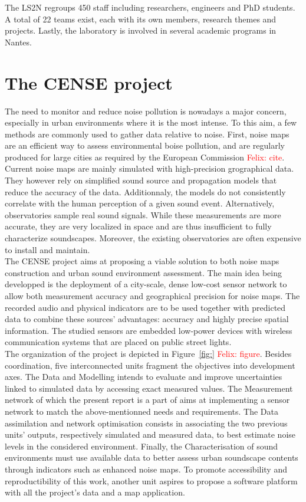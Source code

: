 \documentclass[12pt,times,onecolumn]{article}
\newcommand{\fg}[1]{\textcolor{red}{ Felix: #1}}
\begin{document}
The LS2N regroups 450 staff including researchers, engineers and PhD students. A total of 22 teams exist, each with its own members, research themes and projects. Lastly, the laboratory is involved in several academic programs in Nantes.

\section{The CENSE project}

The need to monitor and reduce noise pollution is nowadays a major concern, especially in urban environments where it is the most intense. To this aim, a few methods are commonly used to gather data relative to noise. First, noise maps are an efficient way to assess environmental boise pollution, and are regularly produced for large cities as required by the European Commission \fg{cite}. Current noise maps are mainly simulated with high-precision grographical data. They however rely on simplified sound source and propagation models that reduce the accuracy of the data. Additionnaly, the models do not consistently correlate with the human perception of a given sound event. Alternatively, observatories sample real sound signals. While these measurements are more accurate, they are very localized in space and are thus insufficient to fully characterize soundscapes. Moreover, the existing observatories are often expensive to install and maintain.\\

The CENSE project aims at proposing a viable solution to both noise maps construction and urban sound environment assessment. The main idea being developped is the deployment of a city-scale, dense low-cost sensor network to allow both measurement accuracy and geographical precision for noise maps. The recorded audio and physical indicators are to be used together with predicted data to combine these sources' advantages: accuracy and highly precise spatial information. The studied sensors are embedded low-power devices with wireless communication systems that are placed on public street lights.\\

The organization of the project is depicted in Figure~\ref{fig:}\fg{figure}. Besides coordination, five interconnected units fragment the objectives into development axes. The Data and Modelling intends to evaluate and improve uncertainties linked to simulated data by accessing exact measured values. The Measurement network of which the present report is a part of aims at implementing a sensor network to match the above-mentionned needs and requirements. The Data assimilation and network optimisation consists in associating the two previous units' outputs, respectively simulated and measured data, to best estimate noise levels in the considered environment. Finally, the Characterisation of sound environments must use available data to better assess urban soundscape contents through indicators such as enhanced noise maps. To promote accessibility and reproductibility of this work, another unit aspires to propose a software platform with all the project's data and a map application.\\
\end{document}
